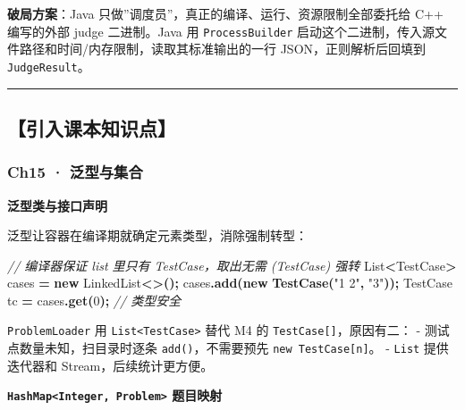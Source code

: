 \documentclass[
  11pt,
]{ctexart}
\newenvironment{Shaded}{\begin{snugshade}}{\end{snugshade}}
\newcommand{\BuiltInTok}[1]{#1}
\newcommand{\CommentTok}[1]{\textcolor[rgb]{0.56,0.35,0.01}{\textit{#1}}}
\newcommand{\DecValTok}[1]{\textcolor[rgb]{0.00,0.00,0.81}{#1}}
\newcommand{\FunctionTok}[1]{\textcolor[rgb]{0.13,0.29,0.53}{\textbf{#1}}}
\newcommand{\KeywordTok}[1]{\textcolor[rgb]{0.13,0.29,0.53}{\textbf{#1}}}
\newcommand{\NormalTok}[1]{#1}
\newcommand{\OperatorTok}[1]{\textcolor[rgb]{0.81,0.36,0.00}{\textbf{#1}}}
\newcommand{\StringTok}[1]{\textcolor[rgb]{0.31,0.60,0.02}{#1}}
\begin{document}
\textbf{破局方案}：Java
只做''调度员''，真正的编译、运行、资源限制全部委托给 C++ 编写的外部
judge 二进制。Java 用 \texttt{ProcessBuilder}
启动这个二进制，传入源文件路径和时间/内存限制，读取其标准输出的一行
JSON，正则解析后回填到 \texttt{JudgeResult}。

\begin{center}\rule{0.5\linewidth}{0.5pt}\end{center}

\hypertarget{ux5f15ux5165ux8bfeux672cux77e5ux8bc6ux70b9-1}{%
\subsection{【引入课本知识点】}\label{ux5f15ux5165ux8bfeux672cux77e5ux8bc6ux70b9-1}}

\hypertarget{ch15-ux6cdbux578bux4e0eux96c6ux5408}{%
\subsubsection{Ch15 ·
泛型与集合}\label{ch15-ux6cdbux578bux4e0eux96c6ux5408}}

\textbf{泛型类与接口声明}

泛型让容器在编译期就确定元素类型，消除强制转型：

\begin{Shaded}
\begin{Highlighting}[]
\CommentTok{// 编译器保证 list 里只有 TestCase，取出无需 (TestCase) 强转}
\BuiltInTok{List}\OperatorTok{\textless{}}\NormalTok{TestCase}\OperatorTok{\textgreater{}}\NormalTok{ cases }\OperatorTok{=} \KeywordTok{new} \BuiltInTok{LinkedList}\OperatorTok{\textless{}\textgreater{}();}
\NormalTok{cases}\OperatorTok{.}\FunctionTok{add}\OperatorTok{(}\KeywordTok{new} \FunctionTok{TestCase}\OperatorTok{(}\StringTok{"1 2"}\OperatorTok{,} \StringTok{"3"}\OperatorTok{));}
\NormalTok{TestCase tc }\OperatorTok{=}\NormalTok{ cases}\OperatorTok{.}\FunctionTok{get}\OperatorTok{(}\DecValTok{0}\OperatorTok{);}  \CommentTok{// 类型安全}
\end{Highlighting}
\end{Shaded}

\texttt{ProblemLoader} 用 \texttt{List\textless{}TestCase\textgreater{}}
替代 M4 的 \texttt{TestCase{[}{]}}，原因有二： -
测试点数量未知，扫目录时逐条 \texttt{add()}，不需要预先
\texttt{new\ TestCase{[}n{]}}。 - \texttt{List} 提供迭代器和
Stream，后续统计更方便。

\textbf{\texttt{HashMap\textless{}Integer,\ Problem\textgreater{}}
题目映射}
\end{document}
